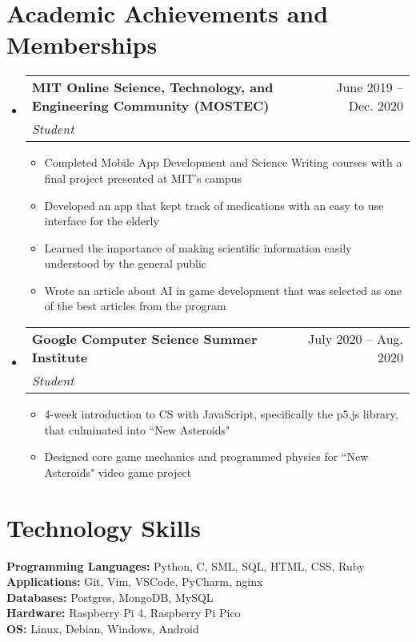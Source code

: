\documentclass[letterpaper,11pt]{article}
\makeatletter
\newcommand{\resumeItem}[1]{
  \item\small{
    {#1 \vspace{-2pt}}
  }
}
\newcommand{\resumeSubheading}[4]{
  \vspace{-2pt}\item
    \begin{tabular*}{0.97\textwidth}[t]{l@{\extracolsep{\fill}}r}
      \textbf{#1} & #2 \\
      \textit{\small#3} & \textit{\small #4} \\
    \end{tabular*}\vspace{-7pt}
}
\newcommand{\resumeSubSubheading}[2]{
    \item
    \begin{tabular*}{0.97\textwidth}{l@{\extracolsep{\fill}}r}
      \textit{\small#1} & \textit{\small #2} \\
    \end{tabular*}\vspace{-7pt}
}
\newcommand{\resumeSubHeadingListStart}{\begin{itemize}[leftmargin=0.15in, label={}]}
\newcommand{\resumeSubHeadingListEnd}{\end{itemize}}
\newcommand{\resumeItemListStart}{\begin{itemize}}
\newcommand{\resumeItemListEnd}{\end{itemize}\vspace{-5pt}}
\makeatother
\begin{document}
\section{Academic Achievements and Memberships}
    \resumeSubHeadingListStart
        \resumeSubheading
        {MIT Online Science, Technology, and Engineering Community (MOSTEC)}{June 2019 -- Dec. 2020}
        {Student}{}
            \resumeItemListStart
                \resumeItem{Completed Mobile App Development and Science Writing courses with a final project presented at MIT’s campus}
                \resumeItem{Developed an app that kept track of medications with an easy to use interface for the elderly}
                \resumeItem{Learned the importance of making scientific information easily understood by the general public}
                \resumeItem{Wrote an article about AI in game development that was selected as one of the best articles from the program}
            \resumeItemListEnd

        \resumeSubheading
        {Google Computer Science Summer Institute}{July 2020 -- Aug. 2020}{Student}{}
            \resumeItemListStart
                \resumeItem{4-week introduction to CS with JavaScript, specifically the p5.js library, that culminated into “New Asteroids"}
                \resumeItem{Designed core game mechanics and  programmed physics for “New Asteroids" video game project}
            \resumeItemListEnd
    \resumeSubHeadingListEnd
      

\section{Technology Skills}
    \begin{itemize}[leftmargin=0.15in, label={}]
        \small{\item{
            \textbf{Programming Languages: }{Python, C, SML, SQL, HTML, CSS, Ruby} \\
            \textbf{Applications: }{Git, Vim, VSCode, PyCharm, nginx} \\
            \textbf{Databases: }{Postgres, MongoDB, MySQL} \\
            \textbf{Hardware: }{Raspberry Pi 4, Raspberry Pi Pico} \\
            \textbf{OS: }{Linux, Debian, Windows, Android}
        }}
    \end{itemize}
\end{document}
